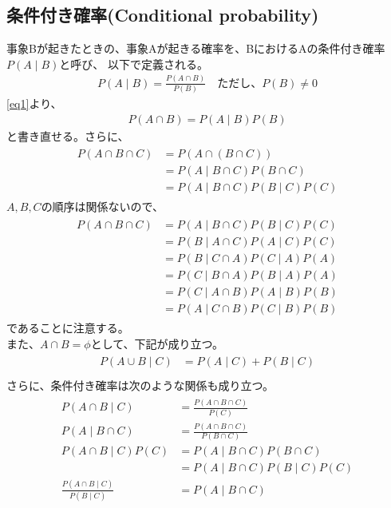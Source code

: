 \documentclass[a4j]{jarticle}
\begin{document}
\subsection{条件付き確率(Conditional probability)}
事象Bが起きたときの、事象Aが起きる確率を、BにおけるAの条件付き確率$P(A \mid B)$と呼び、
以下で定義される。
\begin{align}
    P(A \mid B) = \frac{P(A \cap B)}{P(B)}
    \quad \text{ただし、$P(B) \neq 0$}\label{eq1}
\end{align}
\eqref{eq1}より、
\begin{align}
    P(A \cap B) = P(A \mid B)P(B)
\end{align}
と書き直せる。さらに、
\begin{align}
    \begin{aligned}
    P(A \cap B \cap C) &= P(A \cap (B \cap C)) \\
    &= P(A \mid B \cap C)P(B \cap C) \\
    &= P(A \mid B \cap C)P(B \mid C)P(C)
    \end{aligned}
\end{align}
$A,B,C$の順序は関係ないので、
\begin{align}
    \begin{aligned}
    P(A \cap B \cap C) &= P(A \mid B \cap C)P(B \mid C)P(C) \\
    &= P(B \mid A \cap C)P(A \mid C)P(C) \\
    &= P(B \mid C \cap A)P(C \mid A)P(A) \\
    &= P(C \mid B \cap A)P(B \mid A)P(A) \\
    &= P(C \mid A \cap B)P(A \mid B)P(B) \\
    &= P(A \mid C \cap B)P(C \mid B)P(B) 
    \end{aligned}
\end{align}
であることに注意する。\\
また、$A \cap B = \phi$として、下記が成り立つ。
\begin{align}
    \begin{aligned}
    P(A \cup B \mid C) &= P(A \mid C) + P(B \mid C) \\
    \end{aligned}
\end{align}
さらに、条件付き確率は次のような関係も成り立つ。
\begin{align}
    \begin{aligned}
    P(A \cap B \mid C) &= \frac{P(A \cap B \cap C)}{P(C)} \\
    P(A \mid B \cap C) &= \frac{P(A \cap B \cap C)}{P(B \cap C)} \\
    P(A \cap B \mid C)P(C) &= P(A \mid B \cap C)P(B \cap C) \\
    &= P(A \mid B \cap C)P(B \mid C)P(C) \\
    \frac{P(A \cap B \mid C)}{P(B \mid C)} &= P(A \mid B \cap C) \label{eq:cond1}
    \end{aligned}
\end{align}
\end{document}
